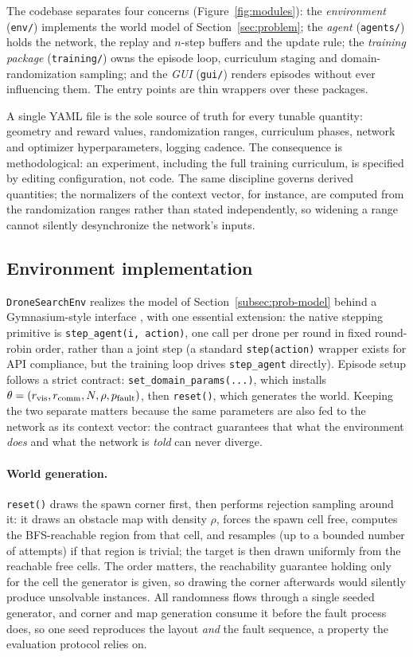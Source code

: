 The codebase separates four concerns (Figure~\ref{fig:modules}): the
\emph{environment} (\texttt{env/}) implements the world model of
Section~\ref{sec:problem}; the \emph{agent} (\texttt{agents/}) holds the network,
the replay and $n$-step buffers and the update rule; the \emph{training package}
(\texttt{training/}) owns the episode loop, curriculum staging and
domain-randomization sampling; and the \emph{GUI} (\texttt{gui/}) renders
episodes without ever influencing them. The entry points are thin wrappers over
these packages.

A single YAML file is the sole source of truth for every tunable quantity:
geometry and reward values, randomization ranges, curriculum phases, network and
optimizer hyperparameters, logging cadence. The consequence is methodological:
an experiment, including the full training curriculum, is specified by editing
configuration, not code. The same discipline governs derived quantities; the
normalizers of the context vector, for instance, are computed from the
randomization ranges rather than stated independently, so widening a range cannot
silently desynchronize the network's inputs.

\subsection{Environment implementation}
\label{subsec:arch-env}

\texttt{DroneSearchEnv} realizes the model of Section~\ref{subsec:prob-model}
behind a Gymnasium-style interface \citep{towers2024gymnasium}, with one
essential extension: the native stepping primitive is
\texttt{step\_agent(i, action)}, one call per drone per round in fixed
round-robin order, rather than a joint step (a standard \texttt{step(action)}
wrapper exists for API compliance, but the training loop drives
\texttt{step\_agent} directly). Episode setup follows a strict contract:
\texttt{set\_domain\_params(...)}, which installs
$\theta = (r_{\mathrm{vis}}, r_{\mathrm{comm}}, N, \rho, p_{\mathrm{fault}})$, then \texttt{reset()}, which
generates the world. Keeping the two separate matters because the same parameters
are also fed to the network as its context vector: the contract guarantees that
what the environment \emph{does} and what the network is \emph{told} can never
diverge.

\paragraph{World generation.}
\texttt{reset()} draws the spawn corner first, then performs rejection sampling
around it: it draws an obstacle map with density $\rho$, forces the spawn cell
free, computes the BFS-reachable region from that cell, and resamples (up to a
bounded number of attempts) if that region is trivial; the target is then drawn
uniformly from the reachable free cells. The order matters, the reachability
guarantee holding only for the cell the generator is given, so drawing the
corner afterwards would silently produce unsolvable instances. All
randomness flows through a single seeded generator, and corner and map
generation consume it before the fault process does, so one seed reproduces the
layout \emph{and} the fault sequence, a property the evaluation protocol relies
on.

